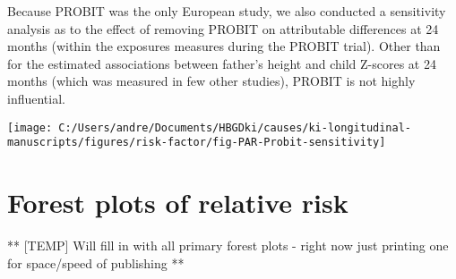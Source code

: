 \documentclass[9pt,]{book}
\begin{document}
Because PROBIT was the only European study, we also conducted a
sensitivity analysis as to the effect of removing PROBIT on attributable
differences at 24 months (within the exposures measures during the
PROBIT trial). Other than for the estimated associations between
father's height and child Z-scores at 24 months (which was measured in
few other studies), PROBIT is not highly influential.

\texttt{[image: C:/Users/andre/Documents/HBGDki/causes/ki-longitudinal-manuscripts/figures/risk-factor/fig-PAR-Probit-sensitivity]}

\chapter{Forest plots of relative risk}\label{RR-forest}

\raggedright

** {[}TEMP{]} Will fill in with all primary forest plots - right now
just printing one for space/speed of publishing **


\end{document}
